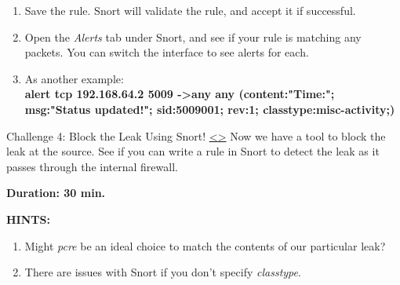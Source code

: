 \documentclass[12pt]{extarticle}
\newenvironment{instructionblock}{\Large\bgroup}{\egroup}
\begin{document}
\begin{enumerate}
    \item Save the rule. Snort will validate the rule, and accept it if successful.
    \item Open the \textit{Alerts} tab under Snort, and see if your rule is matching any packets. You can switch the interface to see alerts for each.
    
    \item As another example:\\
    \textbf{alert tcp 192.168.64.2 5009 -\textgreater any any (content:"Time:"; msg:"Status updated!"; sid:5009001; rev:1; classtype:misc-activity;)}
\end{enumerate}








\pagebreak
\begin{slide}{ Challenge 4: Block the Leak Using Snort! }{ \hyperref[slide 17]{\textless}\hyperref[slide 19]{\textgreater} }
\vskip 5pt
\begin{instructionblock}
	Now we have a tool to block the leak at the source. See if you can write a rule in Snort to detect the leak as it passes through the internal firewall.
	
	\vspace{40mm}
	\begin{center}
	\textbf{\Large{Duration: 30 min.} }
	\end{center}
	
\end{instructionblock}
\end{slide}


\vspace{8mm}
\noindent
\textbf{HINTS:}
\begin{enumerate}
\item Might \textit{pcre} be an ideal choice to match the contents of our particular leak?
\item There are issues with Snort if you don't specify \textit{classtype}.
\end{enumerate}







\end{document}

